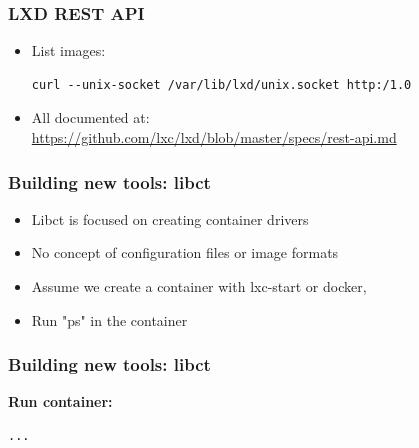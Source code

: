 \documentclass{beamer}
\begin{document}
\begin{frame}[fragile]
\frametitle{LXD REST API}
\begin{itemize}
\item List images: \\
{\tiny
  \begin{lstlisting}
curl --unix-socket /var/lib/lxd/unix.socket http:/1.0
  \end{lstlisting}
}

%
%

\item All documented at: \\
{\tiny
\url{https://github.com/lxc/lxd/blob/master/specs/rest-api.md}
}
\end{itemize}
\end{frame}

\begin{frame}
\frametitle{Building new tools: libct}
\begin{itemize}
\item Libct is focused on creating container drivers
\item No concept of configuration files or image formats
\item Assume we create a container with lxc-start or docker,
\item Run "ps" in the container
\end{itemize}
\end{frame}

\begin{frame}[fragile]
\frametitle{Building new tools: libct}
{\bf Run container:} \\
{\tiny
\begin{lstlisting}
...
\end{lstlisting}
}
\end{frame}
\end{document}
